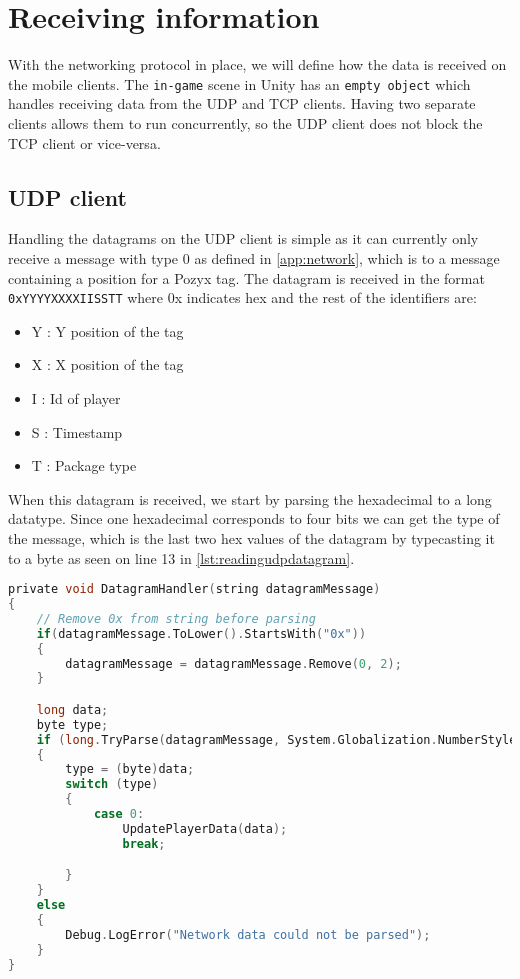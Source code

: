 \section{Receiving information}
With the networking protocol in place, we will define how the data is received on the mobile clients.
The \texttt{in-game} scene in Unity has an \texttt{empty object} which handles receiving data from the UDP and TCP clients.
Having two separate clients allows them to run concurrently, so the UDP client does not block the TCP client or vice-versa.

\subsection*{UDP client}
Handling the datagrams on the UDP client is simple as it can currently only receive a message with type 0 as defined in \autoref{app:network}, which is to a message containing a position for a Pozyx tag.
The datagram is received in the format \texttt{0xYYYYXXXXIISSTT} where 0x indicates hex and the rest of the identifiers are:
\begin{itemize}
    \item Y : Y position of the tag
    \item X : X position of the tag
    \item I : Id of player
    \item S : Timestamp
    \item T : Package type
\end{itemize}

\noindent
When this datagram is received, we start by parsing the hexadecimal to a long datatype.
Since one hexadecimal corresponds to four bits we can get the type of the message, which is the last two hex values of the datagram by typecasting it to a byte as seen on line 13 in \autoref{lst:readingudpdatagram}.

\begin{lstlisting}[caption={Processing datagrams in UDP client}, captionpos=b,language=C,label={lst:readingudpdatagram}]
private void DatagramHandler(string datagramMessage)
{
    // Remove 0x from string before parsing
    if(datagramMessage.ToLower().StartsWith("0x"))
    {
        datagramMessage = datagramMessage.Remove(0, 2);
    }

    long data;
    byte type;
    if (long.TryParse(datagramMessage, System.Globalization.NumberStyles.HexNumber, System.Globalization.CultureInfo.InvariantCulture, out data))
    {
        type = (byte)data;
        switch (type)
        {
            case 0:
                UpdatePlayerData(data);
                break;

        }
    }
    else
    {
        Debug.LogError("Network data could not be parsed");
    }
}
\end{lstlisting}

